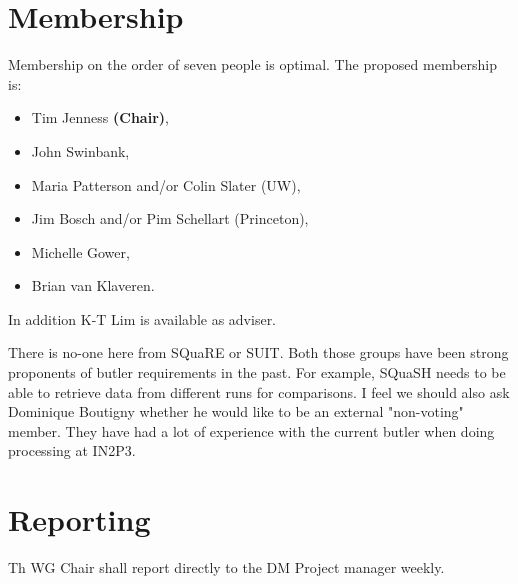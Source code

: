 \section{Membership}

Membership on the order of seven people is optimal.
The proposed membership is:

\begin{itemize}
  \item Tim Jenness \textbf{(Chair)},
  \item John Swinbank,
  \item Maria Patterson and/or Colin Slater (UW),
  \item Jim Bosch and/or Pim Schellart (Princeton),
  \item Michelle Gower,
  \item Brian van Klaveren.
\end{itemize}

In addition K-T Lim is available as adviser.

\begin{draftnote}
  There is no-one here from SQuaRE or SUIT.
  Both those groups have been strong proponents of butler requirements in the past.
  For example, SQuaSH needs to be able to retrieve data from different runs for comparisons.
  I feel we should also ask Dominique Boutigny whether he would like to be an external "non-voting" member.
  They have had a lot of experience with the current butler when doing processing at IN2P3.
\end{draftnote}


\section{Reporting}

Th WG Chair shall report directly to the DM Project manager weekly.
